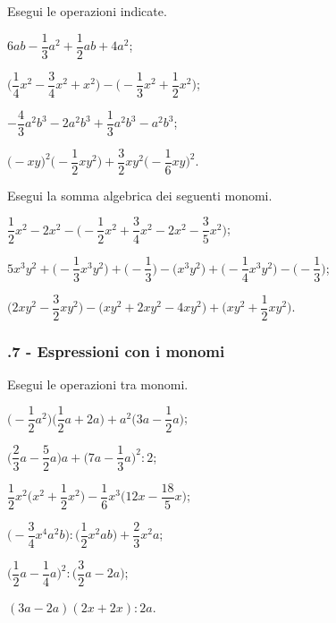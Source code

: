\begin{esercizio}[\Ast]
 \label{ese:10.30} %
Esegui le operazioni indicate.
\begin{multicols}{2}
\begin{enumeratea}
\spazielenx
 \item $6ab-\dfrac{1}{3}a^{2}+\dfrac{1}{2}ab+4a^{2}$;
 \item $\bigg(\dfrac{1}{4}x^{2}-\dfrac{3}{4}x^{2}+x^{2}\bigg)-\bigg(-{\dfrac{1}{3}}x^{2}+\dfrac{1}{2}x^{2}\bigg)$;
 \item $-{\dfrac{4}{3}}a^{2}b^{3}-2a^{2}b^{3}+\dfrac{1}{3}a^{2}b^{3}-a^{2}b^{3}$;
 \item $\big(-xy\big)^{2}\bigg(-{\dfrac{1}{2}}xy^{2}\bigg)+\dfrac{3}{2}xy^{2}\bigg(-{\dfrac{1}{6}}xy\bigg)^{2}$.
\end{enumeratea}
\end{multicols}
\end{esercizio}

\begin{esercizio}[\Ast]
 \label{ese:10.31} %
Esegui la somma algebrica dei seguenti monomi.

\begin{enumeratea}
\spazielenx
 \item $\dfrac{1}{2}x^{2}-2x^{2}-\bigg(-{\dfrac{1}{2}}x^{2}+\dfrac{3}{4}x^{2}-2x^{2}-\dfrac{3}{5}x^{2}\bigg)$;
 \item $5x^{3}y^{2}+\bigg(-{\dfrac{1}{3}}x^{3}y^{2}\bigg)+\bigg(-{\dfrac{1}{3}}\bigg)-\big(x^{3}y^{2}\big)+\bigg(-{\dfrac{1}{4}}x^{3}y^{2}\bigg)-\bigg(-{\dfrac{1}{3}}\bigg)$;
 \item $\bigg(2xy^{2}-\dfrac{3}{2}xy^{2}\bigg)-\big(xy^{2}+2xy^{2}-4xy^{2}\big)+\bigg(xy^{2}+\dfrac{1}{2}xy^{2}\bigg)$.
\end{enumeratea}
\end{esercizio}

\subsubsection*{\thechapter.7 - Espressioni con i monomi}
\begin{esercizio}[\Ast]
 \label{ese:10.32} %
Esegui le operazioni tra monomi.
\begin{multicols}{2}
\begin{enumeratea}
 \item $\bigg(-\dfrac{1}{2}a^{2}\bigg)\bigg(\dfrac{1}{2}a+2a\bigg)+a^{2}\bigg(3a-\dfrac{1}{2}a\bigg)$;
 \item $\bigg(\dfrac{2}{3}a-\dfrac{5}{2}a\bigg)a+\bigg(7a-\dfrac{1}{3}a\bigg)^{2}:2$;
 \item $\dfrac{1}{2}x^{2}\bigg(x^{2}+\dfrac{1}{2}x^{2}\bigg)-\dfrac{1}{6}x^{3}\bigg(12x-\dfrac{18}{5}x\bigg)$;
 \item $\bigg(-{\dfrac{3}{4}}x^{4}a^{2}b\bigg):\bigg(\dfrac{1}{2}x^{2}ab\bigg)+\dfrac{2}{3}x^{2}a$;
 \item $\bigg(\dfrac{1}{2}a-\dfrac{1}{4}a\bigg)^{2}:\bigg(\dfrac{3}{2}a-2a\bigg)$;
 \item $(3a-2a)(2x+2x):2a$.
\end{enumeratea}
\end{multicols}
\end{esercizio}

